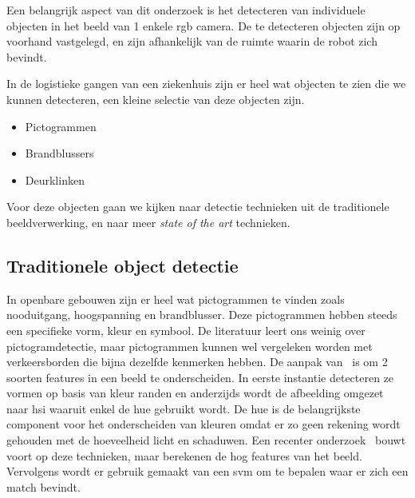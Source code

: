         Een belangrijk aspect van dit onderzoek is het detecteren van individuele objecten in het beeld van 1 enkele \gls{rgb} camera.
        De te detecteren objecten zijn op voorhand vastgelegd, en zijn afhankelijk van de ruimte waarin de robot zich bevindt.

        In de logistieke gangen van een ziekenhuis zijn er heel wat objecten te zien die we kunnen detecteren, een kleine selectie van deze objecten zijn.

        \begin{itemize}
            \item Pictogrammen
            \item Brandblussers
            \item Deurklinken
        \end{itemize}

        Voor deze objecten gaan we kijken naar detectie technieken uit de traditionele beeldverwerking, en naar meer \textit{state of the art} technieken. 


        \subsection{Traditionele object detectie}
            In openbare gebouwen zijn er heel wat pictogrammen te vinden zoals nooduitgang, hoogspanning en brandblusser. Deze pictogrammen hebben steeds een specifieke vorm, kleur en symbool.
            De literatuur leert ons weinig over pictogramdetectie, maar pictogrammen kunnen wel vergeleken worden met verkeersborden die bijna dezelfde kenmerken hebben.
            De aanpak van~\cite{Fang2003} is om 2 soorten features in een beeld te onderscheiden. In eerste instantie detecteren ze vormen op basis van kleur randen en anderzijds wordt de
            afbeelding omgezet naar \gls{hsi} waaruit enkel de hue gebruikt wordt. De hue is de belangrijkste component voor het onderscheiden van kleuren omdat er zo geen rekening wordt gehouden
            met de hoeveelheid licht en schaduwen.
            Een recenter onderzoek~\cite{Zabihi2017} bouwt voort op deze technieken,
            maar berekenen de \gls{hog} features van het beeld. Vervolgens wordt er gebruik gemaakt van een \gls{svm} om te bepalen waar er zich een match bevindt.

